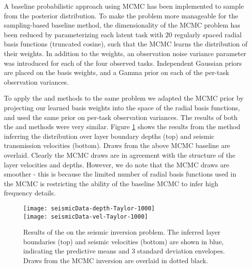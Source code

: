 
A baseline probabilistic approach using MCMC has been implemented to sample
from the posterior distribution. To make the problem more manageable for the
sampling-based baseline method, the dimensionality of the MCMC problem has been
reduced by parameterizing each latent task with $20$ regularly spaced radial
basis functions (truncated cosine), such that the MCMC learns the distribution
of their weights. In addition to the weights, an observation noise variance
parameter was introduced for each of the four observed tasks. Independent
Gaussian priors are placed on the basis weights, and a Gamma prior on each of
the per-task observation variances.

To apply the \eks and \uks methods to the same problem we adapted the MCMC
prior by projecting our learned basis weights into the space of the radial
basis functions, and used the same prior on per-task observation variances.
The results of both the \eks and \uks methods were very similar. Figure
\ref{fig:seismic_result} shows the results from the \eks method inferring the
distribution over layer boundary depths (top) and seismic transmission
velocities (bottom). Draws from the above MCMC baseline are overlaid. Clearly
the MCMC draws are in agreement with the structure of the layer velocities and
depths. However, we do note that the MCMC draws are smoother - this is because
the limited number of radial basis functions used in the MCMC is restricting
the ability of the baseline MCMC to infer high frequency details.

\begin{figure}
\texttt{[image: seismicData-depth-Taylor-1000]} \\
\texttt{[image: seismicData-vel-Taylor-1000]}
\caption{Results of the \eks on the seismic inversion problem. The inferred 
    layer boundaries (top) and seismic velocities (bottom) are shown in blue, 
    indicating the predictive means and 3 standard deviation envelopes. Draws
    from the MCMC inversion are overlaid in dotted black.}
 \label{fig:seismic_result}
\end{figure}

